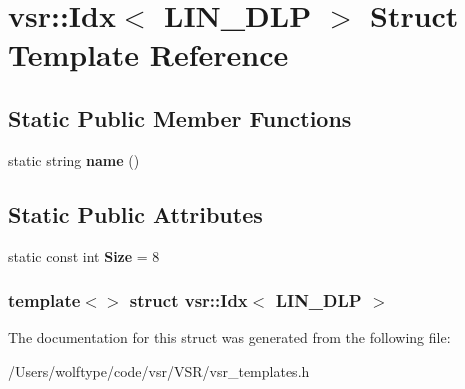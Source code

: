 \hypertarget{structvsr_1_1_idx_3_01_l_i_n___d_l_p_01_4}{\section{vsr\-:\-:Idx$<$ L\-I\-N\-\_\-\-D\-L\-P $>$ Struct Template Reference}
\label{structvsr_1_1_idx_3_01_l_i_n___d_l_p_01_4}
}
\subsection*{Static Public Member Functions}
\begin{DoxyCompactItemize}
\item 
\hypertarget{structvsr_1_1_idx_3_01_l_i_n___d_l_p_01_4_a1a85452acb37b8bfd534fc774840a234}{static string {\bfseries name} ()}\label{structvsr_1_1_idx_3_01_l_i_n___d_l_p_01_4_a1a85452acb37b8bfd534fc774840a234}

\end{DoxyCompactItemize}
\subsection*{Static Public Attributes}
\begin{DoxyCompactItemize}
\item 
\hypertarget{structvsr_1_1_idx_3_01_l_i_n___d_l_p_01_4_ad009569859a7dc8d86e4b9de147d1b4b}{static const int {\bfseries Size} = 8}\label{structvsr_1_1_idx_3_01_l_i_n___d_l_p_01_4_ad009569859a7dc8d86e4b9de147d1b4b}

\end{DoxyCompactItemize}
\subsubsection*{template$<$$>$ struct vsr\-::\-Idx$<$ L\-I\-N\-\_\-\-D\-L\-P $>$}



The documentation for this struct was generated from the following file\-:\begin{DoxyCompactItemize}
\item 
/\-Users/wolftype/code/vsr/\-V\-S\-R/vsr\-\_\-templates.\-h\end{DoxyCompactItemize}
